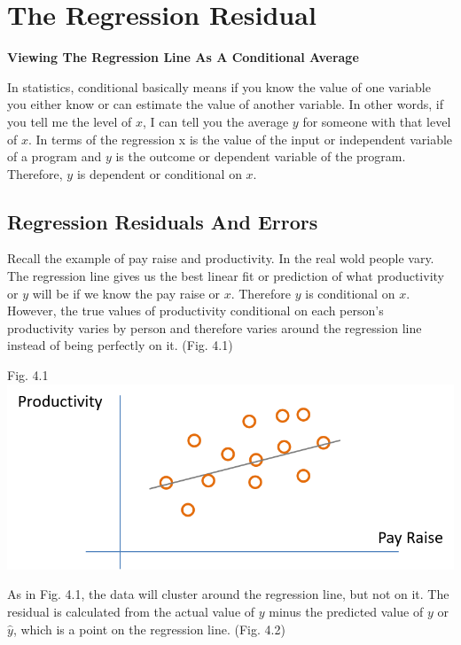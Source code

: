 \documentclass[]{book}
\theoremstyle{definition}
\theoremstyle{definition}
\theoremstyle{definition}
\theoremstyle{remark}
\begin{document}
\hypertarget{the-regression-residual}{%
\chapter{The Regression Residual}\label{the-regression-residual}}

\textbf{Viewing The Regression Line As A Conditional Average}

In statistics, conditional basically means if you know the value of one
variable you either know or can estimate the value of another variable.
In other words, if you tell me the level of \(x\), I can tell you the
average \(y\) for someone with that level of \(x\). In terms of the
regression x is the value of the input or independent variable of a
program and \(y\) is the outcome or dependent variable of the program.
Therefore, \(y\) is dependent or conditional on \(x\).

\hypertarget{regression-residuals-and-errors}{%
\section{Regression Residuals And
Errors}\label{regression-residuals-and-errors}}

Recall the example of pay raise and productivity. In the real wold
people vary. The regression line gives us the best linear fit or
prediction of what productivity or \(y\) will be if we know the pay
raise or \(x\). Therefore \(y\) is conditional on \(x\). However, the
true values of productivity conditional on each person's productivity
varies by person and therefore varies around the regression line instead
of being perfectly on it. (Fig. 4.1)

Fig. 4.1 \includegraphics{figures/Pay_Productivity_With_Variance.png}

As in Fig. 4.1, the data will cluster around the regression line, but
not on it. The residual is calculated from the actual value of \(y\)
minus the predicted value of \(y\) or \(\hat{y}\), which is a point on
the regression line. (Fig. 4.2)
\end{document}
